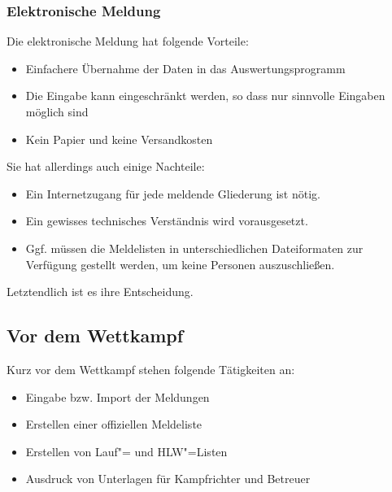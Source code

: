 \documentclass[11pt,a4paper,twoside,ngerman]{article}
\begin{document}
\subsubsection*{Elektronische Meldung}
Die elektronische Meldung hat folgende Vorteile:
\begin{itemize}

\item Einfachere Übernahme der Daten in das Auswertungsprogramm


\item Die Eingabe kann eingeschränkt werden, so dass nur sinnvolle Eingaben möglich sind


\item Kein Papier und keine Versandkosten


\end{itemize}


Sie hat allerdings auch einige Nachteile:
\begin{itemize}

\item Ein Internetzugang für jede meldende Gliederung ist nötig.


\item Ein gewisses technisches Verständnis wird vorausgesetzt.


\item Ggf. müssen die Meldelisten in unterschiedlichen Dateiformaten zur Verfügung gestellt werden, um keine Personen auszuschließen.


\end{itemize}


Letztendlich ist es ihre Entscheidung.


\newpage

\subsection{Vor dem Wettkampf}
\label{lbl:vordemwettkampf::begin}
Kurz vor dem Wettkampf stehen folgende Tätigkeiten an:


\begin{itemize}

\item Eingabe bzw. Import der Meldungen


\item Erstellen einer offiziellen Meldeliste


\item Erstellen von Lauf"= und HLW"=Listen


\item Ausdruck von Unterlagen für Kampfrichter und Betreuer


\end{itemize}
\end{document}
